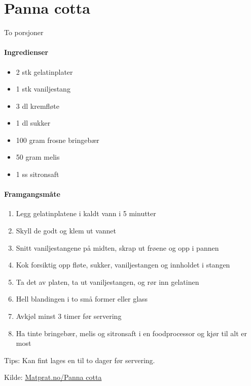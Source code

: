 \section{﻿Panna cotta}
\label{pannacotta}
To porsjoner

\paragraph{Ingredienser}
\begin{itemize}[noitemsep]
	\item 2 stk gelatinplater
	\item 1 stk vaniljestang
	\item 3 dl kremfløte
	\item 1 dl sukker
	\item 100 gram frosne bringebær
	\item 50 gram melis
	\item 1 ss sitronsaft
\end{itemize}

\paragraph{Framgangsmåte}
\begin{enumerate}[noitemsep]
	\item Legg gelatinplatene i kaldt vann i 5 minutter
	\item Skyll de godt og klem ut vannet
	\item Snitt vaniljestangene på midten, skrap ut frøene og opp i pannen
	\item Kok forsiktig opp fløte, sukker, vaniljestangen og innholdet i stangen
	\item Ta det av platen, ta ut vaniljestangen, og rør inn gelatinen
	\item Hell blandingen i to små former eller glass
	\item Avkjøl minst 3 timer før servering
	\item Ha tinte bringebær, melis og sitronsaft i en foodprocessor og kjør til alt er most
\end{enumerate}

Tips: Kan fint lages en til to dager før servering.


Kilde: \href{http://www.matprat.no/gjester/gjesteoppskrifter/panna-cotta/}{Matprat.no/Panna cotta}
